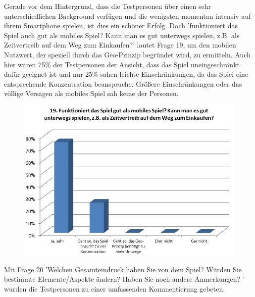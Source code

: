 \documentclass[extern,palatino]{cgBA}
\begin{document}
Gerade vor dem Hintergrund, dass die Testpersonen über einen sehr unterschiedlichen Background verfügen und die wenigsten momentan intensiv auf ihrem Smartphone spielen, ist dies ein schöner Erfolg. Doch 'funktioniert das Spiel auch gut als mobiles Spiel? Kann man es gut unterwegs spielen, z.B. als Zeitvertreib auf dem Weg zum Einkaufen?' lautet Frage 19, um den mobilen Nutzwert, der speziell durch das Geo-Prinzip begründet wird, zu ermitteln. Auch hier waren 75\% der Testpersonen der Ansicht, dass das Spiel uneingeschränkt dafür geeignet ist und nur 25\% sahen leichte Einschränkungen, da das Spiel eine  entsprechende Konzentration beanspruche. Größere Einschränkungen oder das völlige Versagen als mobiles Spiel sah keine der Personen. 
\begin{figure}[H]
	\centering
	\includegraphics[width=1\textwidth]{table16.jpg}
\end{figure}
Mit Frage 20 'Welchen Gesamteindruck haben Sie von dem Spiel? Würden Sie bestimmte Elemente/Aspekte ändern? Haben Sie noch andere Anmerkungen? ' wurden die Testpersonen zu einer umfassenden Kommentierung gebeten.
\end{document}
